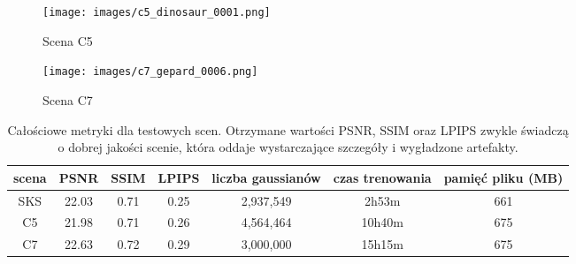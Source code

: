 \begin{figure}[!h]
    \centering
    \texttt{[image: images/c5\_dinosaur\_0001.png]}
    \caption{Scena C5}
    \label{fig:c5_gs}
\end{figure}

\begin{figure}[!h]
    \centering
    \texttt{[image: images/c7\_gepard\_0006.png]}
    \caption{Scena C7}
    \label{fig:c7_gs}
\end{figure}

\begin{table}[!h]
    \centering
    \begin{tabular}{|c|c|c|c|c|c|c|}
    \hline
    scena & PSNR & SSIM & LPIPS & liczba gaussianów & czas trenowania & pamięć pliku (MB) \\
    \hline 
    SKS & 22.03 & 0.71 & 0.25 & 2,937,549 & 2h53m & 661 \\
    \hline 
    C5 & 21.98 & 0.71 & 0.26 & 4,564,464 & 10h40m & 675 \\
    \hline 
    C7 & 22.63 & 0.72 & 0.29 & 3,000,000 & 15h15m & 675 \\
    \hline
    \end{tabular}
\caption{Całościowe metryki dla testowych scen. Otrzymane wartości PSNR, SSIM oraz LPIPS zwykle świadczą o dobrej jakości scenie, która oddaje wystarczające szczegóły i wygładzone artefakty.}
\label{table:tab_gs_res}
\end{table}
